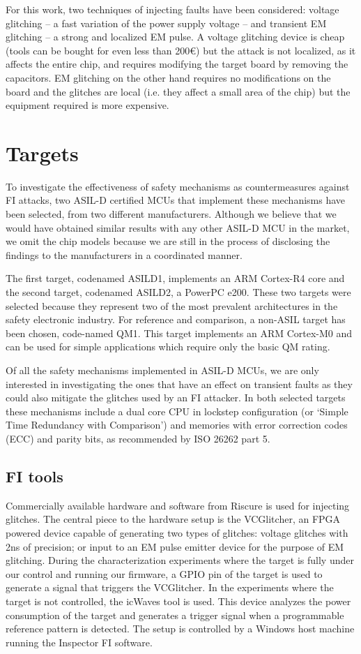 \documentclass[a4paper, 10pt]{IEEEtran}
\newcommand{\TI}{ASILD1\xspace}
\newcommand{\ST}{ASILD2\xspace}
\newcommand{\NXP}{QM1\xspace}
\begin{document}
For this work, two techniques of injecting faults have been considered: voltage glitching -- a fast variation of the power supply voltage -- and transient EM glitching -- a strong and localized EM pulse. A voltage glitching device is cheap (tools can be bought for even less than 200€) but the attack is not localized, as it affects the entire chip, and requires modifying the target board by removing the capacitors. EM glitching on the other hand requires no modifications on the board and the glitches are local (i.e. they affect a small area of the chip) but the equipment required is more expensive. 


\section{Targets}
To investigate the effectiveness of safety mechanisms as countermeasures against FI attacks, two ASIL-D certified MCUs that implement these mechanisms have been selected, from two different 
manufacturers. 
Although we believe that we would have obtained similar results with any other ASIL-D MCU in the market, we omit the chip models because we are still in the process of disclosing the findings to the manufacturers in a coordinated manner.


The first target, codenamed \TI, implements an ARM Cortex-R4 core and the second target, codenamed \ST, a PowerPC e200. These two targets were selected because they represent two of the most prevalent architectures in the safety electronic industry. For reference and comparison, a non-ASIL target has been chosen, code-named \NXP. This target implements an ARM Cortex-M0 and can be used for simple applications which require only the basic QM rating.

Of all the safety mechanisms implemented in ASIL-D MCUs, we are only interested in investigating the ones that have an effect on transient faults as they could also mitigate the glitches used by an FI attacker. In both selected targets these mechanisms include a dual core CPU in lockstep configuration (or `Simple Time Redundancy with Comparison') and memories with error correction codes (ECC) and parity bits, as recommended by ISO 26262 part 5. 

\subsection{FI tools}
Commercially available hardware \cite{riscure_hardware} and software \cite{riscure_inspector} from Riscure is used for injecting glitches.
The central piece to the hardware setup is the VCGlitcher, an FPGA powered device capable of generating two types of glitches: voltage glitches with 2ns of precision; or input to an EM pulse emitter device for the purpose of EM glitching. During the characterization experiments where the target is fully under our control and running our firmware, a GPIO pin of the target is used to generate a signal that triggers the VCGlitcher. In the experiments where the target is not controlled, the icWaves tool is used. This device analyzes the power consumption of the target and generates a trigger signal when a programmable reference pattern is detected. The setup is controlled by a Windows host machine running the Inspector FI software.
\end{document}
